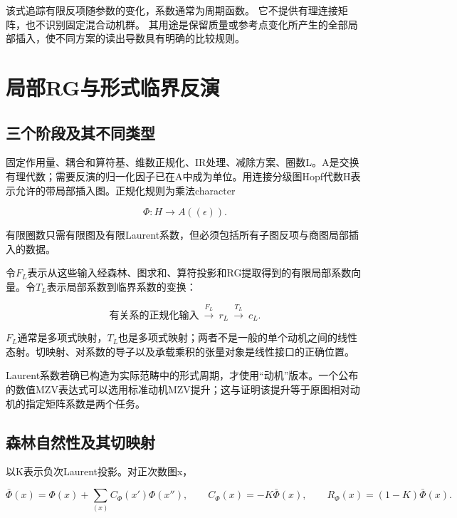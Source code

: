 \documentclass[11pt,a4paper,oneside]{ctexart}
\theoremstyle{cnplain}
\theoremstyle{definition}
\theoremstyle{remark}
\numberwithin{equation}{section}
\begin{document}
该式追踪有限反项随参数的变化，系数通常为周期函数。
它不提供有理连接矩阵，也不识别固定混合动机群。
其用途是保留质量或参考点变化所产生的全部局部插入，使不同方案的读出导数具有明确的比较规则。


\endgroup

\section{局部RG与形式临界反演}\label{ch:rg}

\begingroup

\subsection{三个阶段及其不同类型}\label{sec:rg:1}

固定作用量、耦合和算符基、维数正规化、IR处理、减除方案、圈数L。A是交换有理代数；需要反演的归一化因子已在A中成为单位。用连接分级图Hopf代数H表示允许的带局部插入图。正规化规则为乘法character

\begin{equation}
\Phi:H\longrightarrow A((\epsilon)).
\end{equation}

有限圈数只需有限图及有限Laurent系数，但必须包括所有子图反项与商图局部插入的数据。

令\(F_L\)表示从这些输入经森林、图求和、算符投影和RG提取得到的有限局部系数向量。令\(T_L\)表示局部系数到临界系数的变换：

\begin{equation}
\text{有关系的正规化输入}\ \xrightarrow{F_L}\
 r_L\ \xrightarrow{T_L}\ c_L.                    \label{eq:rg:1}
\end{equation}

\(F_L\)通常是多项式映射，\(T_L\)也是多项式映射；两者不是一般的单个动机之间的线性态射。切映射、对系数的导子以及承载乘积的张量对象是线性接口的正确位置。

Laurent系数若确已构造为实际范畴中的形式周期，才使用``动机''版本。一个公布的数值MZV表达式可以选用标准动机MZV提升；这与证明该提升等于原图相对动机的指定矩阵系数是两个任务。


\subsection{森林自然性及其切映射}\label{sec:rg:2}

以K表示负次Laurent投影。对正次数图x，

\begin{equation}
\bar\Phi(x)=\Phi(x)+\sum_{(x)}C_\Phi(x')\Phi(x''),\qquad
 C_\Phi(x)=-K\bar\Phi(x),\qquad
 R_\Phi(x)=(1-K)\bar\Phi(x).                        \label{eq:rg:2}
\end{equation}
\end{document}
